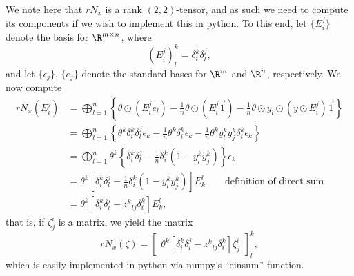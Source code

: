 We note here that $rN_x$ is a rank $(2,2)$-tensor, and as such we need to compute its components if we wish to implement this in python.  To this end, let $\{E_i^j\}$ denote the basis for $\R^{m\times n}$, where
$$(E^j_i)^k_l=\delta^k_i\delta_l^j,$$
and let $\{\epsilon_j\}$, $\{e_j\}$ denote the standard bases for $\R^m$ and $\R^n$, respectively.  We now compute
\begin{align*}
	rN_x(E_i^j)&=\bigoplus_{l=1}^n\left\{\theta\odot(E_i^je_l)-\frac{1}{n}\theta\odot(E_i^j\vec{1})-\frac{1}{n}\theta\odot y_l\odot(y\odot E_i^j)\vec{1}\right\}\\
	&=\bigoplus_{l=1}^n\left\{\theta^k\delta_i^k\delta_l^j\epsilon_k-\frac{1}{n}\theta^k\delta^k_i\epsilon_k-\frac{1}{n}\theta^ky^k_ly^k_j\delta^k_i\epsilon_k\right\}\\
	&=\bigoplus_{l=1}^n\theta^k\left\{\delta_i^k\delta_l^j-\frac{1}{n}\delta_i^k(1-y_l^ky_j^k)\right\}\epsilon_k\\
	&=\theta^k\left[\delta_i^k\delta_l^j-\frac{1}{n}\delta_i^k(1-y_l^ky_j^k)\right]E_k^l\qquad\text{definition of direct sum}\\
	&=\theta^k[\delta_i^k\delta_l^j-z^k{_{lj}}\delta_i^k]E_k^l,
\end{align*}
that is, if $\zeta^i_j$ is a matrix, we yield the matrix
$$rN_x(\zeta)=\begin{bmatrix}
	\theta^k[\delta_i^k\delta_l^j-z^k{_{lj}}\delta_i^k]\zeta^i_j
\end{bmatrix}^k_l,$$
which is easily implemented in python via numpy's ``einsum'' function.

